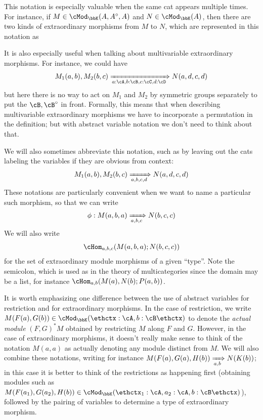 \documentclass{amsart}
\makeatletter
\newcommand{\A}{\cA}
\newcommand{\B}{\cB}
\newcommand{\C}{\cC}
\newcommand{\D}{\cD}
\newcommand{\E}{\cE}
\newcommand{\K}{\bbK}
\let\mod\cMod
\def\modk{\mod_\K}
\renewcommand{\o}{^{\circ}}
\let\vdash\Longrightarrow
\def\types{\;\vdash\;} %
\def\mtoo#1{\xRightarrow[#1]{}}
\def\modkv#1{\modk({\thctx #1\ethctx})}
\def\thctx#1\ethctx{\@@ctx#1,,}
\def\thincolon#1:#2\endtc{#1\mathord{:}#2}
\def\@@ctx#1,{\@ifmtarg{#1}{\let\next=\relax}{\thincolon#1\endtc\let\next=\@@@ctx}\next}
\def\@@@ctx#1,{\@ifmtarg{#1}{\let\next=\relax}{,\thincolon#1\endtc\let\next=\@@@ctx}\next}
\def\mhomv#1#2#3{\cHom_{#1}(#2;#3)}
\def\cb{\;\mid\;} %
\makeatother
\begin{document}
This notation is especially valuable when the same cat appears multiple times.
For instance, if $M\in\modk(A,A\o,A)$ and $N\in\modk(A)$, then there are two kinds of extraordinary morphisms from $M$ to $N$, which are represented in this notation as
It is also especially useful when talking about multivariable extraordinary morphisms.
For instance, we could have
\[ M_1(a,b), M_2(b,c) \mtoo{a:\A,b:\B,c:\C,d:\D} N(a,d,c,d) \]
but here there is no way to act on $M_1$ and $M_2$ by symmetric groups separately to put the $\B,\B\o$ in front.
Formally, this means that when describing multivariable extraordinary morphisms we have to incorporate a permutation in the definition; but with abstract variable notation we don't need to think about that.

We will also sometimes abbreviate this notation, such as by leaving out the cats labeling the variables if they are obvious from context:
\[ M_1(a,b), M_2(b,c) \mtoo{a,b,c,d} N(a,d,c,d) \]
These notations are particularly convenient when we want to name a particular such morphism, so that we can write
\[ \phi : M(a,b,a) \mtoo{a,b,c} N(b,c,c) \]
We will also write
\[\mhomv{a,b,c}{M(a,b,a)}{N(b,c,c)}\]
for the set of extraordinary module morphisms of a given ``type''.
Note the semicolon, which is used as in the theory of multicategories since the domain may be a list, for instance $\mhomv{a,b}{M(a),N(b)}{P(a,b)}$.

It is worth emphasizing one difference between the use of abstract variables for restriction and for extraordinary morphisms.
In the case of restriction, we write $M(F(a),G(b))\in \modkv{a:\A,b:\B}$ to denote the \emph{actual module} $(F,G)^*M$ obtained by restricting $M$ along $F$ and $G$.
However, in the case of extraordinary morphisms, it doesn't really make sense to think of the notation $M(a,a)$ as actually denoting any module distinct from $M$.
We will also combine these notations, writing for instance $M(F(a),G(a),H(b))\mtoo{a,b} N(K(b))$; in this case it is better to think of the restrictions as happening first (obtaining modules such as $M(F(a_1),G(a_2),H(b))\in \modkv{a_1:\A,a_2:\A,b:\B}$), followed by the pairing of variables to determine a type of extraordinary morphism.
\end{document}
